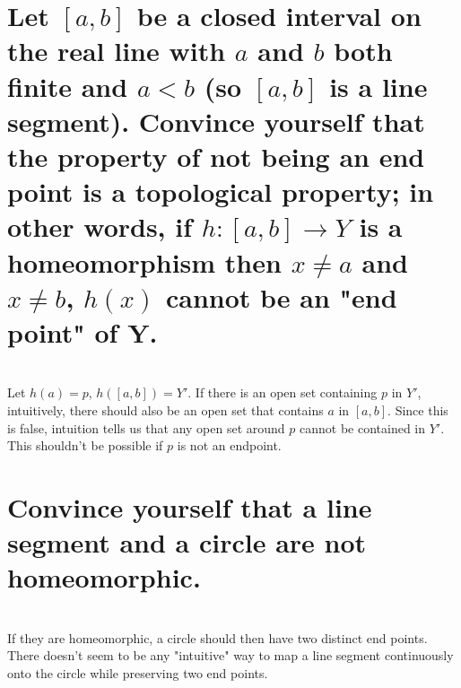 \begin{parts}
 
 \part{Let $[a,b]$ be a closed interval on the real line with $a$ and $b$ both finite and $a < b$ (so $[a,b]$ is a line segment). Convince yourself that the property of not being an end point is a topological property; in other words, if $h:[a,b] \rightarrow Y$ is a homeomorphism then $x \neq a$ and $x \neq b$, $h(x)$ cannot be an "end point" of Y.}
 
 
\begin{solution}
 \\Let $h(a) = p$, $h([a,b]) = Y'$. If there is an open set containing $p$ in $Y'$, intuitively, there should also be an open set that contains $a$ in $[a,b]$. Since this is false, intuition tells us that any open set around $p$ cannot be contained in $Y'$. This shouldn't be possible if $p$ is not an endpoint.
\end{solution}

\part{Convince yourself that a line segment and a circle are not homeomorphic.}

\begin{solution}
 \\If they are homeomorphic, a circle should then have two distinct end points. There doesn't seem to be any "intuitive" way to map a line segment continuously onto the circle while preserving two end points.
\end{solution}

\end{parts}


